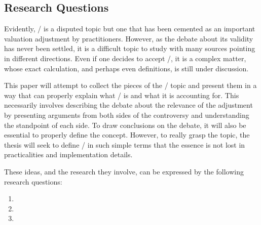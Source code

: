 \documentclass[main.tex]{subfiles}
\begin{document}
    \subsection{Research Questions}
        
    Evidently, \FVA/ is a disputed topic 
    but one that has been cemented as an important valuation adjustment by practitioners.
    However, as the debate about its validity has never been settled,
    it is a difficult topic to study with many sources pointing in different directions.
    Even if one decides to accept \FVA/, it is a complex matter,
    whose exact calculation, and perhaps even definitions, is still under discussion.

    This paper will attempt to collect the pieces of the \FVA/ topic
    and present them in a way that can properly explain what \FVA/ is and what it is accounting for.
    This necessarily involves describing the debate about the relevance of the adjustment
    by presenting arguments from both sides of the controversy 
    and understanding the standpoint of each side.
    To draw conclusions on the debate, it will also be essential to properly define the concept.
    However, to really grasp the topic, the thesis will seek to define \FVA/ in such simple terms 
    that the essence is not lost in practicalities and implementation details.

    These ideas, and the research they involve, can be expressed by the following research questions:
    \begin{enumerate}
        \item \researchQuestionFundingCosts
        \item \researchQuestionFvaDebate
        \item \researchQuestionFvaImplications
    \end{enumerate}
\end{document}
